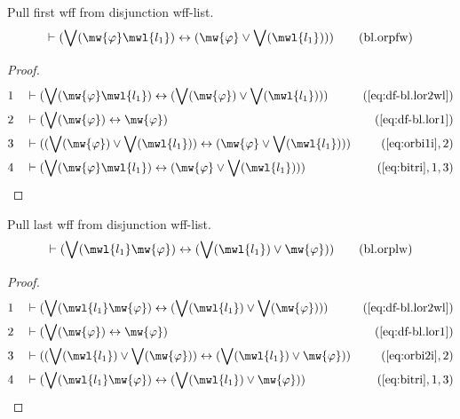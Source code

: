 \begin{lemma} Pull first wff from disjunction wff-list.
\begin{align}
\vdash ( \bigvee( \mw{\varphi} \mwl{l_1} ) \leftrightarrow ( \mw{\varphi} \vee
    \bigvee( \mwl{l_1} ) ) )\label{eq:bl.orpfw}\tag{bl.orpfw}
\end{align}
\end{lemma}

\begin{proof}
\begin{align}
  1 &&  & \vdash ( \bigvee( \mw{\varphi} \mwl{l_1} ) \leftrightarrow ( \bigvee( \mw{\varphi} ) \vee \bigvee( \mwl{l_1} ) ) )&(\mbox{\ref{eq:df-bl.lor2wl}})\notag
  \\ 2 &&  & \vdash ( \bigvee( \mw{\varphi} ) \leftrightarrow \mw{\varphi} )&(\mbox{\ref{eq:df-bl.lor1}})\notag
  \\ 3 &&  & \vdash ( ( \bigvee( \mw{\varphi} ) \vee \bigvee( \mwl{l_1} ) ) \leftrightarrow ( \mw{\varphi} \vee \bigvee( \mwl{l_1} ) ) )&(\mbox{\ref{eq:orbi1i}},2)\notag
  \\ 4 &&  & \vdash ( \bigvee( \mw{\varphi} \mwl{l_1} ) \leftrightarrow ( \mw{\varphi} \vee \bigvee( \mwl{l_1} ) ) )&(\mbox{\ref{eq:bitri}},1,3)\notag
\end{align}
\end{proof}

\begin{lemma} Pull last wff from disjunction wff-list.
\begin{align}
\vdash ( \bigvee( \mwl{l_1} \mw{\varphi} ) \leftrightarrow ( \bigvee( \mwl{l_1}
    ) \vee \mw{\varphi} ) )\label{eq:bl.orplw}\tag{bl.orplw}
\end{align}
\end{lemma}

\begin{proof}
\begin{align}
  1 &&  & \vdash ( \bigvee( \mwl{l_1} \mw{\varphi} ) \leftrightarrow ( \bigvee( \mwl{l_1} ) \vee \bigvee( \mw{\varphi} ) ) )&(\mbox{\ref{eq:df-bl.lor2wl}})\notag
  \\ 2 &&  & \vdash ( \bigvee( \mw{\varphi} ) \leftrightarrow \mw{\varphi} )&(\mbox{\ref{eq:df-bl.lor1}})\notag
  \\ 3 &&  & \vdash ( ( \bigvee( \mwl{l_1} ) \vee \bigvee( \mw{\varphi} ) ) \leftrightarrow ( \bigvee( \mwl{l_1} ) \vee \mw{\varphi} ) )&(\mbox{\ref{eq:orbi2i}},2)\notag
  \\ 4 &&  & \vdash ( \bigvee( \mwl{l_1} \mw{\varphi} ) \leftrightarrow ( \bigvee( \mwl{l_1} ) \vee \mw{\varphi} ) )&(\mbox{\ref{eq:bitri}},1,3)\notag
\end{align}
\end{proof}


